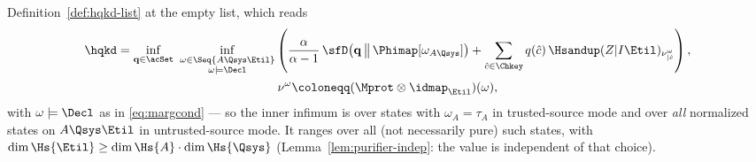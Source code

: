 \begin{theorem}
Definition~\ref{def:hqkd-list} at the empty list, which reads
\begin{equation}\label{eq:hqkd-def}
\begin{gathered}
  \hqkd=\inf_{\mathbf q\in\acSet}\
  \inf_{\substack{\omega\in\Seq{A\Qsys\Etil}\\ \omega\models\Decl}}
  \left(\frac{\alpha}{\alpha-1}\,
  \sfD\!\left(\mathbf q\,\middle\|\,\Phimap[\omega_{A\Qsys}]\right)
  +\sum_{\hat c\in\Chkey}
  q(\hat c)\,\Hsandup(Z|I\Etil)_{\nu^{\omega}_{|\hat c}}\right),\\
  \nu^{\omega}\coloneqq(\Mprot\otimes\idmap_{\Etil})(\omega),
\end{gathered}
\end{equation}
with $\omega\models\Decl$ as in \eqref{eq:margcond} --- so the inner
infimum is over states with $\omega_A=\tau_A$ in trusted-source mode
and over \emph{all} normalized states on $A\Qsys\Etil$ in
untrusted-source mode. It ranges over all (not necessarily pure) such
states, with
$\dim\Hs{\Etil}\ge\dim\Hs{A}\cdot\dim\Hs{\Qsys}$
(Lemma~\ref{lem:purifier-indep}: the value is independent of that
choice).
\end{theorem}

